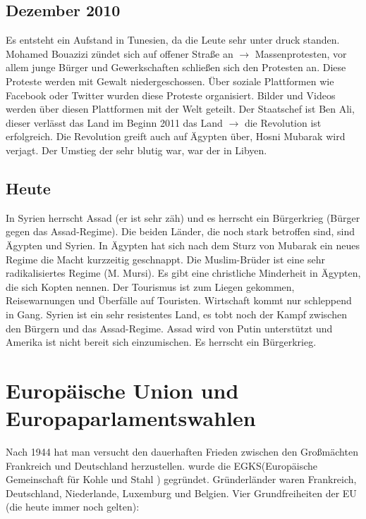 \documentclass[a4paper,final]{report}
\begin{document}
\subsection{Dezember 2010}

Es entsteht ein Aufstand in Tunesien, da die Leute sehr unter druck standen. Mohamed Bouazizi zündet sich auf offener Straße an $\rightarrow$ Massenprotesten,  vor allem junge Bürger und Gewerkschaften schließen sich den Protesten an. Diese Proteste werden mit Gewalt niedergeschossen. Über soziale Plattformen wie Facebook oder Twitter wurden diese Proteste organisiert. Bilder und Videos werden über diesen Plattformen mit der Welt geteilt. Der Staatschef ist Ben Ali, dieser verlässt das Land im Beginn 2011 das Land $\rightarrow$ die Revolution ist erfolgreich. Die Revolution greift auch auf Ägypten über, Hosni Mubarak wird verjagt. Der Umstieg der sehr blutig war, war der in Libyen.

\subsection{Heute}

In Syrien herrscht Assad (er ist sehr zäh) und es herrscht ein Bürgerkrieg (Bürger gegen das Assad-Regime).
\newline
\newline
Die beiden Länder, die noch stark betroffen sind, sind Ägypten und Syrien. In Ägypten hat sich nach dem Sturz von Mubarak ein neues Regime die Macht kurzzeitig geschnappt. Die Muslim-Brüder ist eine sehr radikalisiertes Regime (M. Mursi). Es gibt eine christliche Minderheit in Ägypten, die sich Kopten nennen. Der Tourismus ist zum Liegen gekommen, Reisewarnungen und Überfälle auf Touristen. Wirtschaft kommt nur schleppend in Gang. Syrien ist ein sehr resistentes Land, es tobt noch der Kampf zwischen den Bürgern und das Assad-Regime. Assad wird von Putin unterstützt und Amerika ist nicht bereit sich einzumischen. Es herrscht ein Bürgerkrieg.

\newpage

\section{Europäische Union und Europaparlamentswahlen}

Nach 1944 hat man versucht den dauerhaften Frieden zwischen den Großmächten Frankreich und Deutschland herzustellen.
\newline
{} wurde die EGKS(Europäische Gemeinschaft für Kohle und Stahl ) gegründet. Gründerländer waren Frankreich, Deutschland, Niederlande, Luxemburg und Belgien.
\newline
\newline
Vier Grundfreiheiten der EU (die heute immer noch gelten):
\end{document}
